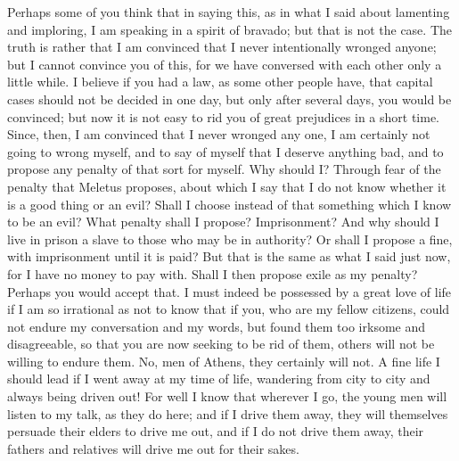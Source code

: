 Perhaps some of you think that in saying this, as in what I said about lamenting and imploring, I am speaking in a spirit of bravado; but that is not the case. The truth is rather that I am convinced that I never intentionally wronged anyone; but I cannot convince you of this, for we have conversed with each other only a little while. I believe if you had a law, as some other people have,  that capital cases should not be decided in one day, but only after several days, you would be convinced; but now it is not easy to rid you of great prejudices in a short time. Since, then, I am convinced that I never wronged any one, I am certainly not going to wrong myself, and to say of myself that I deserve anything bad, and to propose any penalty of that sort for myself. Why should I? Through fear of the penalty that Meletus proposes, about which I say that I do not know whether it is a good thing or an evil? Shall I choose instead of that something which I know to be an evil? What penalty shall I propose? Imprisonment?  And why should I live in prison a slave to those who may be in authority? Or shall I propose a fine, with imprisonment until it is paid? But that is the same as what I said just now, for I have no money to pay with. Shall I then propose exile as my penalty? Perhaps you would accept that. I must indeed be possessed by a great love of life if I am so irrational as not to know that if you, who are my fellow citizens, could not  endure my conversation and my words, but found them too irksome and disagreeable, so that you are now seeking to be rid of them, others will not be willing to endure them. No, men of Athens, they certainly will not. A fine life I should lead if I went away at my time of life, wandering from city to city and always being driven out! For well I know that wherever I go, the young men will listen to my talk, as they do here; and if I drive them away, they will themselves persuade their elders to drive me out, and if  I do not drive them away, their fathers and relatives will drive me out for their sakes.

